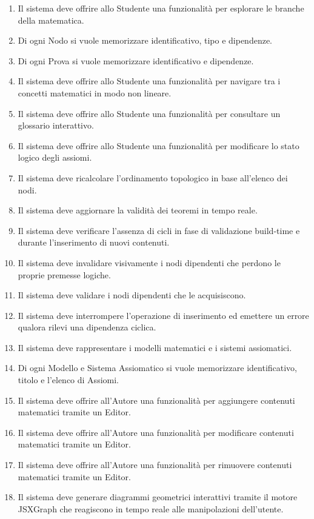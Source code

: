 \documentclass[12pt,a4paper]{article}
\begin{document}
\begin{enumerate}
    \item Il sistema deve offrire allo Studente una funzionalità per esplorare le branche della matematica.
    \item Di ogni Nodo si vuole memorizzare identificativo, tipo e dipendenze.
    \item Di ogni Prova si vuole memorizzare identificativo e dipendenze.
    \item Il sistema deve offrire allo Studente una funzionalità per navigare tra i concetti matematici in modo non lineare.
    \item Il sistema deve offrire allo Studente una funzionalità per consultare un glossario interattivo.
    \item Il sistema deve offrire allo Studente una funzionalità per modificare lo stato logico degli assiomi.
    \item Il sistema deve ricalcolare l'ordinamento topologico in base all'elenco dei nodi.
    \item Il sistema deve aggiornare la validità dei teoremi in tempo reale.
    \item Il sistema deve verificare l'assenza di cicli in fase di validazione build-time e durante l'inserimento di nuovi contenuti.
    \item Il sistema deve invalidare visivamente i nodi dipendenti che perdono le proprie premesse logiche.
    \item Il sistema deve validare i nodi dipendenti che le acquisiscono.
    \item Il sistema deve interrompere l'operazione di inserimento ed emettere un errore qualora rilevi una dipendenza ciclica.
    \item Il sistema deve rappresentare i modelli matematici e i sistemi assiomatici.
    \item Di ogni Modello e Sistema Assiomatico si vuole memorizzare identificativo, titolo e l'elenco di Assiomi.
    \item Il sistema deve offrire all'Autore una funzionalità per aggiungere contenuti matematici tramite un Editor.
    \item Il sistema deve offrire all'Autore una funzionalità per modificare contenuti matematici tramite un Editor.
    \item Il sistema deve offrire all'Autore una funzionalità per rimuovere contenuti matematici tramite un Editor.
    \item Il sistema deve generare diagrammi geometrici interattivi tramite il motore JSXGraph che reagiscono in tempo reale alle manipolazioni dell'utente.
\end{enumerate}
\end{document}
